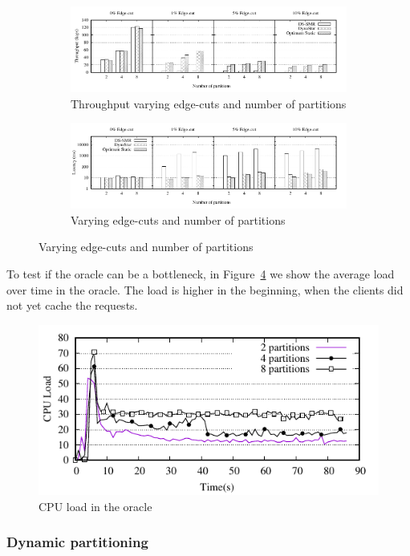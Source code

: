 \begin{figure}[t]
	 \begin{subfigure}[t]{.8\textwidth}
		\includegraphics{figures/experiments/throughput-peak-all}
		\caption{Throughput varying edge-cuts and number of partitions}
		\label{fig:varying_edge_cut}
	\end{subfigure}
	\begin{subfigure}[t]{.8\textwidth}
		\includegraphics{figures/experiments/latency-avg-all}
		\caption{Varying edge-cuts and number of partitions}
		\label{fig:latency-avg-all}
	\end{subfigure}
\end{figure}

To test if the oracle can be a bottleneck, in Figure~\ref{fig:cpu_oracle} we show the average load over time in the oracle.
The load is higher in the beginning, when the clients did not yet cache the requests.

\begin{figure}[t]
	\includegraphics{figures/experiments/oracle-load}
	\caption{CPU load in the oracle}
	\label{fig:cpu_oracle}
\end{figure}

\subsubsection{Dynamic partitioning}




\label{sec:evaluation:strongloc}

